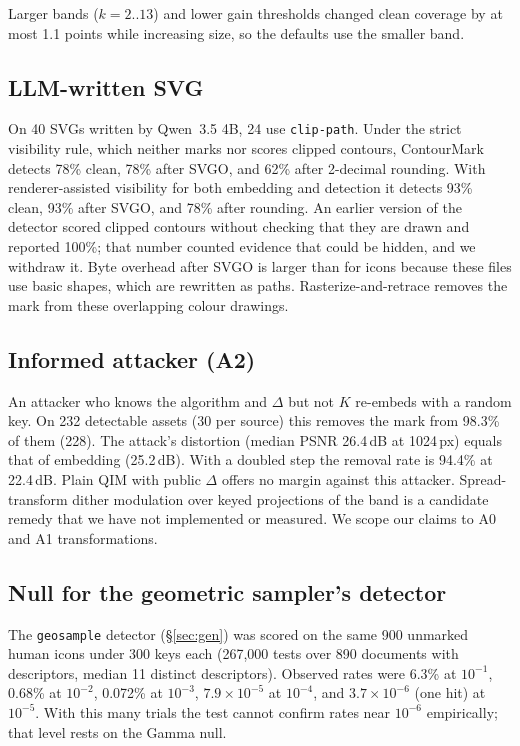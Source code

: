 \documentclass[10pt,twocolumn]{article}
\newcommand{\system}{ContourMark}
\begin{document}
Larger bands ($k{=}2..13$) and lower gain thresholds changed clean coverage by at most 1.1 points while increasing size, so the defaults use the smaller band.

\subsection{LLM-written SVG}
On 40 SVGs written by Qwen~3.5 4B, 24 use \texttt{clip-path}. Under the strict visibility rule, which neither marks nor scores clipped contours, \system{} detects 78\% clean, 78\% after SVGO, and 62\% after 2-decimal rounding. With renderer-assisted visibility for both embedding and detection it detects 93\% clean, 93\% after SVGO, and 78\% after rounding. An earlier version of the detector scored clipped contours without checking that they are drawn and reported 100\%; that number counted evidence that could be hidden, and we withdraw it. Byte overhead after SVGO is larger than for icons because these files use basic shapes, which are rewritten as paths. Rasterize-and-retrace removes the mark from these overlapping colour drawings.

\subsection{Informed attacker (A2)}
An attacker who knows the algorithm and $\Delta$ but not $K$ re-embeds with a random key. On 232 detectable assets (30 per source) this removes the mark from 98.3\% of them (228). The attack's distortion (median PSNR 26.4\,dB at 1024\,px) equals that of embedding (25.2\,dB). With a doubled step the removal rate is 94.4\% at 22.4\,dB. Plain QIM with public $\Delta$ offers no margin against this attacker. Spread-transform dither modulation over keyed projections of the band is a candidate remedy that we have not implemented or measured. We scope our claims to A0 and A1 transformations.

\subsection{Null for the geometric sampler's detector}
The \texttt{geosample} detector (\S\ref{sec:gen}) was scored on the same 900 unmarked human icons under 300 keys each (267{,}000 tests over 890 documents with descriptors, median 11 distinct descriptors). Observed rates were 6.3\% at $10^{-1}$, 0.68\% at $10^{-2}$, 0.072\% at $10^{-3}$, $7.9\times10^{-5}$ at $10^{-4}$, and $3.7\times10^{-6}$ (one hit) at $10^{-5}$. With this many trials the test cannot confirm rates near $10^{-6}$ empirically; that level rests on the Gamma null.
\end{document}
